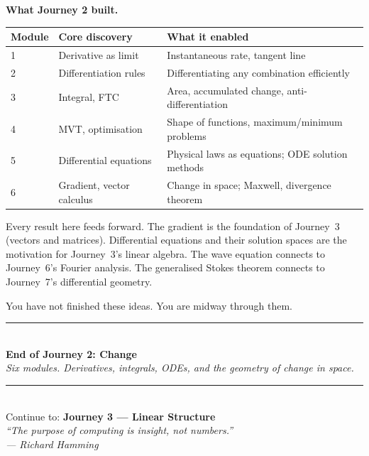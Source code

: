 \documentclass[12pt, a4paper]{article}
\newcounter{problem}
\begin{document}
\begin{namebox}
\textbf{What Journey 2 built.}

\medskip
\begin{center}
\renewcommand{\arraystretch}{1.5}
\begin{tabular}{l l l}
\toprule
\textbf{Module} & \textbf{Core discovery} & \textbf{What it enabled} \\
\midrule
1 & Derivative as limit & Instantaneous rate, tangent line \\
2 & Differentiation rules & Differentiating any combination efficiently \\
3 & Integral, FTC & Area, accumulated change, anti-differentiation \\
4 & MVT, optimisation & Shape of functions, maximum/minimum problems \\
5 & Differential equations & Physical laws as equations; ODE solution methods \\
6 & Gradient, vector calculus & Change in space; Maxwell, divergence theorem \\
\bottomrule
\end{tabular}
\end{center}

\medskip
Every result here feeds forward. The gradient is the foundation of Journey~3 (vectors and matrices). Differential equations and their solution spaces are the motivation for Journey~3's linear algebra. The wave equation connects to Journey~6's Fourier analysis. The generalised Stokes theorem connects to Journey~7's differential geometry.

You have not finished these ideas. You are midway through them.
\end{namebox}

\vspace{1.4cm}
\begin{center}
{\color{Gold}\rule{0.6\linewidth}{1.2pt}}\\[8pt]
{\large\bfseries\color{NavyBlue}End of Journey 2: Change}\\[6pt]
{\normalsize\color{DarkGrey}\itshape Six modules. Derivatives, integrals, ODEs, and the geometry of change in space.}\\[10pt]
{\color{Gold}\rule{0.6\linewidth}{1.2pt}}\\[10pt]
{\small\color{DarkGrey}Continue to: \textbf{Journey 3 --- Linear Structure}}\\[4pt]
{\small\color{DarkGrey}\itshape ``The purpose of computing is insight, not numbers.''\\
\upshape --- Richard Hamming}
\end{center}
\end{document}

